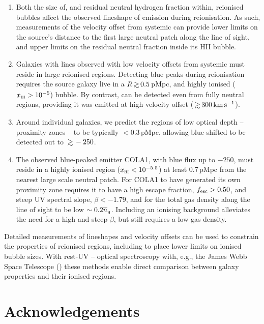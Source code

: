 \documentclass[fleqn,usenatbib]{mnras}
\begin{document}
\begin{enumerate}
    \item Both the size of, and residual neutral hydrogen fraction within, reionised bubbles affect the observed lineshape of \lya emission during reionisation. As such, measurements of the \lya velocity offset from systemic can provide lower limits on the source's distance to the first large neutral patch along the line of sight, and upper limits on the residual neutral fraction inside its HII bubble.
    \item Galaxies with \lya lines observed with low velocity offsets from systemic must reside in large reionised regions. Detecting blue \lya peaks during reionisation requires the source galaxy live in a $R\simgt 0.5$\,pMpc, and highly ionised ($\xHI > 10^{-5}$) bubble. By contrast, \lya can be detected even from fully neutral regions, providing it was emitted at high velocity offset ($\simgt 300\kms$).
    \item Around individual galaxies, we predict the regions of low \lya optical depth -- proximity zones -- to be typically $<0.3$\,pMpc, allowing blue-shifted \lya to be detected out to $\simgt -250$\kms.
    \item The observed blue-peaked \lya emitter COLA1, with blue flux up to $-250$\kms, must reside in a highly ionised region ($\xHI < 10^{-5.5}$) at least 0.7\,pMpc from the nearest large scale neutral patch. For COLA1 to have generated its own proximity zone requires it to have a high escape fraction, $\fesc > 0.50$, and steep UV spectral slope, $\beta < -1.79$, and for the total gas density along the line of sight to be low $\sim0.2\nh$. Including an ionising background alleviates the need for a high \fesc and steep $\beta$, but still requires a low gas density.
\end{enumerate}

Detailed measurements of \lya lineshapes and velocity offsets can be used to constrain the properties of reionised regions, including to place lower limits on ionised bubble sizes. With rest-UV -- optical spectroscopy with, e.g., the James Webb Space Telescope (\JWST) these methods enable direct comparison between galaxy properties and their ionised regions.

\section*{Acknowledgements}
\end{document}
